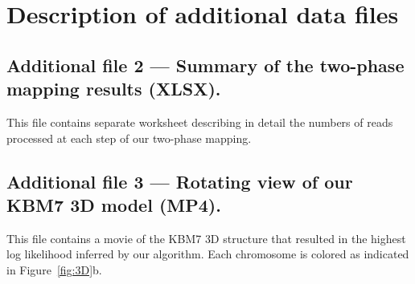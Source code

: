 \section{Description of additional data files}
\vspace{20pt}

  {
  \subsection*{Additional file 2 --- Summary of the two-phase mapping results (XLSX).}
  This file contains separate worksheet describing in detail the numbers of reads
  processed at each step of our two-phase mapping.
  }
  \subsection*{Additional file 3 --- Rotating view of our KBM7 3D model (MP4).}
  This file contains a movie of the KBM7 3D structure that resulted in the highest log
  likelihood inferred by our algorithm. Each chromosome is colored as indicated in
  Figure~\ref{fig:3D}b.



